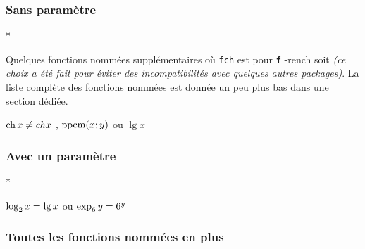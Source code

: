 \documentclass[12pt,a4paper]{article}
\makeatletter
\theoremstyle{definition}
\newcommand\whyprefix[2]{%
	\textbf{\prefix{#1}}-#2%
}
\newcommand\prefix[1]{%
	\texttt{#1}%
}
\newcommand\inenglish{\@ifstar{\@inenglish@star}{\@inenglish@no@star}}
\newcommand\@inenglish@star[1]{%
	\emph{\og #1 \fg}%
}
\newcommand\@inenglish@no@star[1]{%
	\@inenglish@star{#1} en anglais%
}
\newcounter{paraexample}[subsubsection]
\newcommand\@newexample@abstract[2]{%
	\paragraph{%
		#1%
		\if\relax\detokenize{#2}\relax\else {} -- #2\fi%
	}%
}
\newcommand\newparaexample{\@ifstar{\@newparaexample@star}{\@newparaexample@no@star}}
\newcommand\@newparaexample@no@star[1]{%
	\refstepcounter{paraexample}%
	\@newexample@abstract{Exemple \theparaexample}{#1}%
}
\newcommand\@newparaexample@star[1]{%
	\@newexample@abstract{Exemple}{#1}%
}
\makeatother
\begin{document}
\subsubsection{Sans paramètre}

\newparaexample*{}

Quelques fonctions nommées supplémentaires où \prefix{fch} est pour \whyprefix{f}{rench} soit \inenglish{français} \emph{(ce choix a été fait pour éviter des incompatibilités avec quelques autres packages)}. La liste complète des fonctions nommées est donnée un peu plus bas dans une section dédiée.

\begin{latexex}
$\operatorname{\operatorname{ch}} x \neq ch x$ ,
$\operatorname{\operatorname{ppcm}}(x;y)$ ou
$\lg x$
\end{latexex}




\subsubsection{Avec un paramètre}

\newparaexample*{}

\begin{latexex}
$\log_{2} x = \lg x$ ou
$\exp_{6} y = 6^y$
\end{latexex}




\subsubsection{Toutes les fonctions nommées en plus}

\vspace{-1em}
\end{document}
